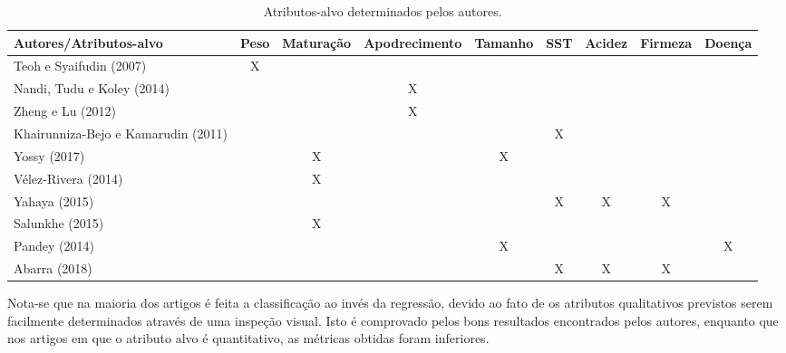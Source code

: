 \begin{center}
	\begin{table}[!htb]
	\tiny
	\caption{\label{tab:artigos_obj} Atributos-alvo determinados pelos autores.}
		\begin{tabular}{>{\centering}p{3.6cm} cccccccc}
			\hline
			Autores/Atributos-alvo					& Peso & Maturação & Apodrecimento & Tamanho & SST & Acidez & Firmeza & Doença \\ \hline
			Teoh e Syaifudin (2007)					& X &	  &   &   &   &   &   &   \\ \hline 
			Nandi, Tudu e Koley (2014)				&   &	  & X &   &   &   &   &   \\ \hline 
			Zheng e Lu (2012)						&   &	  & X &   &   &   &   &   \\ \hline 
			Khairunniza-Bejo e Kamarudin (2011)		&   &	  &   &   & X &   &   &   \\ \hline 
			Yossy (2017)							&   &	X &   & X &   &   &   &   \\ \hline 
			Vélez-Rivera (2014)						&   &	X &   &   &   &   &   &   \\ \hline 
			Yahaya (2015)							&   &	  &   &   & X & X & X &   \\ \hline 
			Salunkhe (2015)							&   &	X &   &   &   &   &   &   \\ \hline 
			Pandey (2014)							&   &	  &   & X &   &   &   & X \\ \hline 
			Abarra (2018)							&   &	  &   &   & X & X & X &   \\ 
			\hline
		\end{tabular}
	\end{table}
\end{center}

Nota-se que na maioria dos artigos é feita a classificação ao invés da regressão, devido ao fato de os atributos qualitativos previstos serem facilmente determinados através de uma inspeção visual. Isto é comprovado pelos bons resultados encontrados pelos autores, enquanto que nos artigos em que o atributo alvo é quantitativo, as métricas obtidas foram inferiores.

